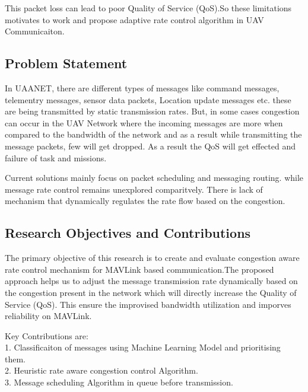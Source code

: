 \documentclass[pdflatex,sn-mathphys-num]{sn-jnl}%
\theoremstyle{thmstyleone}%
\theoremstyle{thmstyletwo}%
\theoremstyle{thmstylethree}%
\begin{document}
This packet loss can lead to poor Quality of Service (QoS).So these limitations motivates to work and propose adaptive rate control algorithm in UAV Communicaiton.







\subsection{ Problem Statement }
In UAANET, there are different types of messages like command messages, telementry messages, sensor data packets, Location update messages etc. these are being transmitted by static transmission rates.
    But, in some cases congestion can occur in the UAV Network where the incoming messages are more when compared to the bandwidth of the network and as a result while transmitting the message packets, few will get dropped. As a result the QoS will get effected and failure of task and missions.

Current solutions mainly focus on packet scheduling and messaging routing. while message rate control remains unexplored comparitvely. There is lack of mechanism that dynamically regulates the rate flow based on the congestion.




\subsection{ Research Objectives and Contributions }
The primary objective of this research is to create and evaluate congestion aware rate control mechanism for MAVLink based communication.The proposed approach helps us to adjust the message transmission rate dynamically based on the congestion present in the network which will directly increase the Quality of Service (QoS). This ensure the improvised bandwidth utilization and imporves reliability on MAVLink.

Key Contributions are:\\
    \hspace*{2em}1. Classificaiton of messages using Machine Learning Model and prioritising them.\\
    \hspace*{2em}2. Heuristic rate aware congestion control Algorithm.\\
    \hspace*{2em}3. Message scheduling Algorithm in queue before transmission.\\
\end{document}
